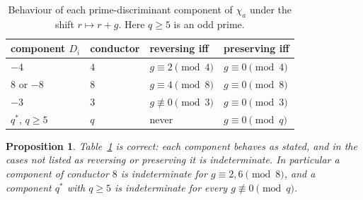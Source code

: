 \documentclass[11pt,reqno]{amsart}
\theoremstyle{plain}
\newtheorem{proposition}[theorem]{Proposition}
\theoremstyle{definition}
\begin{document}
\begin{table}[t]
\centering
\caption{Behaviour of each prime-discriminant component of $\chi_a$ under the
shift $r \mapsto r + g$. Here $q \ge 5$ is an odd prime.}
\label{tab:components}
\begin{tabular}{llll}
\toprule
component $D_i$ & conductor & reversing iff & preserving iff \\
\midrule
$-4$        & $4$ & $g \equiv 2 \pmod 4$   & $g \equiv 0 \pmod 4$ \\
$8$ or $-8$ & $8$ & $g \equiv 4 \pmod 8$   & $g \equiv 0 \pmod 8$ \\
$-3$        & $3$ & $g \not\equiv 0 \pmod 3$ & $g \equiv 0 \pmod 3$ \\
$q^*$, $q \ge 5$ & $q$ & never             & $g \equiv 0 \pmod q$ \\
\bottomrule
\end{tabular}
\end{table}

\begin{proposition}
\label{prop:components}
Table~\ref{tab:components} is correct: each component behaves as stated, and in
the cases not listed as reversing or preserving it is indeterminate. In
particular a component of conductor $8$ is indeterminate for
$g \equiv 2, 6 \pmod 8$, and a component $q^*$ with $q \ge 5$ is indeterminate
for every $g \not\equiv 0 \pmod q$.
\end{proposition}
\end{document}
